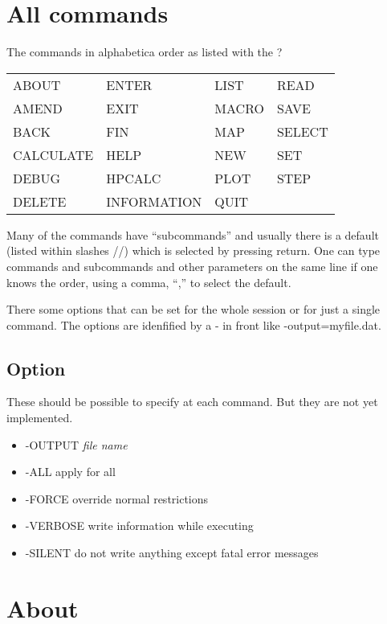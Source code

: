 \documentclass[12pt]{article}
\begin{document}
\section{All commands}

The commands in alphabetica order as listed with the ?

\begin{tabular}{llll}
ABOUT           & ENTER           & LIST           & READ    \\
AMEND           & EXIT            & MACRO          & SAVE    \\
BACK            & FIN             & MAP            & SELECT  \\
CALCULATE       & HELP            & NEW            & SET     \\
DEBUG           & HPCALC          & PLOT           & STEP    \\
DELETE          & INFORMATION     & QUIT                     \\
\end{tabular}

Many of the commands have ``subcommands'' and usually there is a
default (listed within slashes //) which is selected by pressing
return.  One can type commands and subcommands and other parameters on
the same line if one knows the order, using a comma, ``,'' to select
the default.

There some options that can be set for the whole session or for just a
single command.  The options are idenfified by a - in front like
-output=myfile.dat.

\subsection{Option}

These should be possible to specify at each command.  But
they are not yet implemented.

\begin{itemize}
\item -OUTPUT {\em file name}
\item -ALL apply for all
\item -FORCE override normal restrictions
\item -VERBOSE write information while executing
\item -SILENT do not write anything except fatal error messages
\end{itemize}
\section{About}
\end{document}
